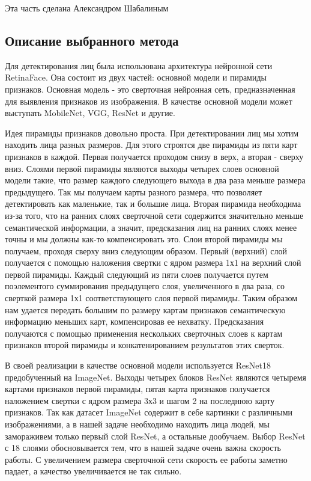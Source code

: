 Эта часть сделана Александром Шабалиным

\subsection{Описание выбранного метода}\label{subsec:описание-выбранного-метода}
Для детектирования лиц была использована архитектура нейронной сети RetinaFace.
Она состоит из двух частей: основной модели и пирамиды признаков.
Основная модель - это сверточная нейронная сеть, предназначенная для выявления признаков из изображения.
В качестве основной модели может выступать MobileNet, VGG, ResNet и другие.
\par Идея пирамиды признаков довольно проста.
При детектировании лиц мы хотим находить лица разных размеров.
Для этого строятся две пирамиды из пяти карт признаков в каждой.
Первая получается проходом снизу в верх, а вторая - сверху вниз.
Слоями первой пирамиды являются выходы четырех слоев основной модели такие,
что размер каждого следующего выхода в два раза меньше размера предыдущего.
Так мы получаем карты разного размера, что позволяет детектировать как маленькие, так и большие лица.
Вторая пирамида необходима из-за того, что на ранних слоях сверточной сети содержится значительно меньше семантической информации,
а значит, предсказания лиц на ранних слоях менее точны и мы должны как-то компенсировать это.
Слои второй пирамиды мы получаем, проходя сверху вниз следующим образом.
Первый (верхний) слой получается с помощью наложения свертки с ядром размера 1х1 на верхний слой первой пирамиды.
Каждый следующий из пяти слоев получается путем поэлементого суммирования предыдущего слоя,
увеличенного в два раза, со сверткой размера 1х1 соответствующего слоя первой пирамиды.
Таким образом нам удается передать большим по размеру картам признаков семантическую информацию меньших карт, компенсировав ее нехватку.
Предсказания получаются с помощью применения нескольких сверточных слоев к картам признаков второй пирамиды и конкатенированием результатов этих сверток.
\\
\par В своей реализации в качестве основной модели используется ResNet18 предобученный на ImageNet.
Выходы четырех блоков ResNet являются четыремя картами признаков первой пирамиды,
пятая карта признаков получается наложением свертки с ядром размера 3х3 и шагом 2 на последнюю карту признаков.
Так как датасет ImageNet содержит в себе картинки с различными изображениями,
а в нашей задаче необходимо находить лица людей, мы замораживем только первый слой ResNet, а остальные дообучаем.
Выбор ResNet с 18 слоями обосновывается тем, что в нашей задаче очень важна скорость работы.
С увеличением размера сверточной сети скорость ее работы заметно падает, а качество увеличивается не так сильно.

